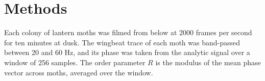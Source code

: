 \documentclass{article}
\begin{document}
\section{Methods}
Each colony of lantern moths was filmed from below at 2000 frames per second for ten minutes
at dusk. The wingbeat trace of each moth was band-passed between 20 and 60 Hz, and its phase
was taken from the analytic signal over a window of 256 samples. The order parameter $R$ is the
modulus of the mean phase vector across moths, averaged over the window.
\end{document}
